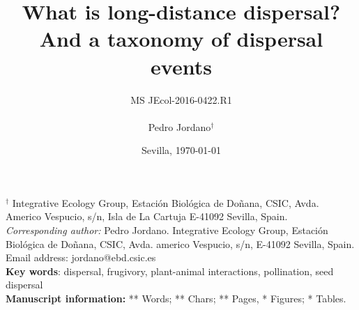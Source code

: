 \documentclass[a4paper, 12pt]{article}
\begin{document}
\title{What is long-distance dispersal? And a taxonomy of dispersal events\\
\vspace{2cm}
}

\author{MS JEcol-2016-0422.R1\\\\Pedro Jordano$^{\dag}$}

\date{Sevilla, \today}

\maketitle


\begin{spacing}{1.0}
$^{\dag}$ {\small Integrative Ecology Group, Estaci\'on Biol\'ogica de 
Do\~nana, CSIC, Avda. Americo Vespucio, s/n, Isla de La Cartuja
E-41092 Sevilla, Spain.}\\


{\small \textit{Corresponding author:} Pedro Jordano. Integrative Ecology Group, Estaci\'on Biol\'ogica de Do\~nana, CSIC, Avda. americo Vespucio, s/n, E-41092 Sevilla, Spain. Email address: jordano@ebd.csic.es}\\

\textbf{Key words}: dispersal, frugivory, plant-animal interactions, pollination, seed dispersal\\

{\small \textbf{Manuscript information: }** Words; ** Chars; ** Pages, * Figures; * Tables.}
\end{spacing}

\maketitle
\newpage

\end{document}
